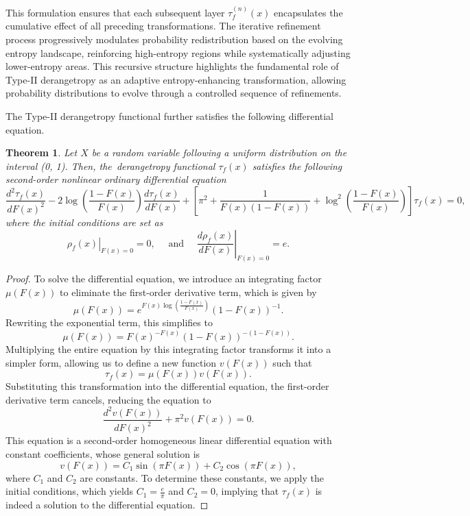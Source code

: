 \documentclass[sn-mathphys-num]{sn-jnl}%
\theoremstyle{thmstyleone}%
\newtheorem{theorem}{Theorem}%
\theoremstyle{thmstyletwo}%
\theoremstyle{thmstylethree}%
\begin{document}
This formulation ensures that each subsequent layer $\tau_f^{(n)}(x)$ encapsulates the cumulative effect of all preceding transformations. The iterative refinement process progressively modulates probability redistribution based on the evolving entropy landscape, reinforcing high-entropy regions while systematically adjusting lower-entropy areas. This recursive structure highlights the fundamental role of Type-II derangetropy as an adaptive entropy-enhancing transformation, allowing probability distributions to evolve through a controlled sequence of refinements.






The Type-II derangetropy functional further satisfies the following differential equation.
\begin{theorem}
	Let $X$ be a random variable following a uniform distribution on the interval (0, 1). Then, the~derangetropy functional $\tau_f(x)$ satisfies the following {\color{black}second-order nonlinear ordinary differential equation}
	\begin{equation} \frac{d^2 \tau_f(x)}{d F(x)^2} - 2 \log \left(\frac{1 - F(x)}{F(x)}\right) \frac{d \tau_f(x)}{d F(x)} + \left[\pi^2 + \frac{1}{F(x)(1 - F(x))} + \log^2 \left(\frac{1 - F(x)}{F(x)}\right) \right] \tau_f(x) = 0, \end{equation}
	where the initial conditions are set as
	$$
	\left.\rho_f(x)\right|_{F(x)=0}=0, \quad \text { and }\left.\quad \frac{d \rho_f(x)}{d F(x)}\right|_{F(x)=0}=e.
	$$
\end{theorem}
\begin{proof}
	To solve the differential equation, we introduce an integrating factor $\mu(F(x))$ to eliminate the first-order derivative term, which is given by
	\begin{equation}
		\mu(F(x))=e^{F(x) \log \left(\frac{1-F(x)}{F(x)}\right)}(1-F(x))^{-1}.
	\end{equation}
	Rewriting the exponential term, this simplifies to
	\begin{equation}
		\mu(F(x))=F(x)^{-F(x)}(1-F(x))^{-(1-F(x))}.
	\end{equation}	
	Multiplying the entire equation by this integrating factor transforms it into a simpler form, allowing us to define a new function $v(F(x))$ such that	
	$$
	\tau_f(x)=\mu(F(x)) v(F(x)).
	$$
	Substituting this transformation into the differential equation, the first-order derivative term cancels, reducing the equation to	
	$$
	\frac{d^2 v(F(x))}{d F(x)^2}+\pi^2 v(F(x))=0.
	$$
	This equation is a second-order homogeneous linear differential equation with constant coefficients, whose general solution is	
	\begin{equation}
		v(F(x))=C_1 \sin (\pi F(x))+C_2 \cos (\pi F(x)),
	\end{equation}
	where $C_1$ and $C_2$ are constants.
	To determine these constants, we apply the initial conditions, which yields $C_1=\frac{e}{\pi}$ and $C_2=0$, implying that $\tau_f(x)$ is indeed a solution to the differential equation.
\end{proof}
\end{document}

